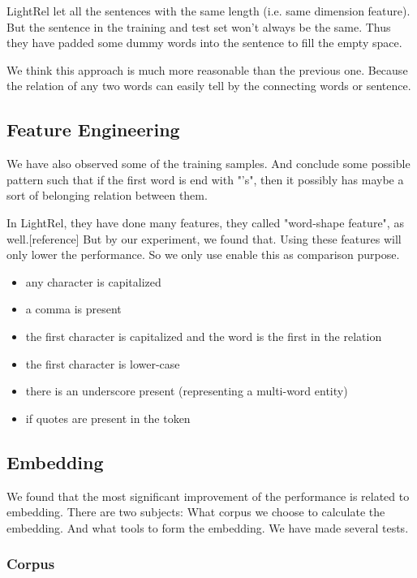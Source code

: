 LightRel let all the sentences with the same length (i.e. same dimension feature). But the sentence in the training and test set won't always be the same. Thus they have padded some dummy words into the sentence to fill the empty space.

We think this approach is much more reasonable than the previous one. Because the relation of any two words can easily tell by the connecting words or sentence.

\subsection{Feature Engineering}
\label{sec:feature_engineering}

We have also observed some of the training samples. And conclude some possible pattern such that if the first word is end with "'s", then it possibly has maybe a sort of belonging relation between them.

In LightRel, they have done many features, they called "word-shape feature", as well.[reference] But by our experiment, we found that. Using these features will only lower the performance. So we only use enable this as comparison purpose.

\begin{itemize}
    \item any character is capitalized
    \item a comma is present
    \item the first character is capitalized and the word is the first in the relation
    \item the first character is lower-case
    \item there is an underscore present (representing a multi-word entity)
    \item if quotes are present in the token
\end{itemize}

\subsection{Embedding}

We found that the most significant improvement of the performance is related to embedding. There are two subjects: What corpus we choose to calculate the embedding. And what tools to form the embedding. We have made several tests.

\subsubsection{Corpus}


